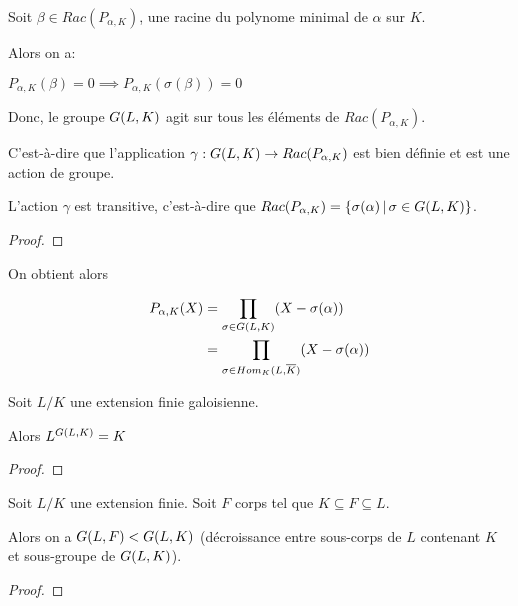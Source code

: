 Soit $\beta \in Rac(P_{\alpha, K})$, une racine du polynome minimal de $\alpha$
sur $K$.

Alors on a:

$P_{\alpha, K}(\beta) = 0 \implies P_{\alpha, K}(\sigma(\beta)) = 0$

Donc, le groupe $G(L, K)$ agit sur tous les éléments de
$Rac(P_{\alpha, K})$.

C'est-à-dire que l'application
$\gamma : G(L, K) \rightarrow Rac(P_{\alpha, K})$ est bien définie
et est une action de groupe.

\begin{proposition}
	L'action $\gamma$ est transitive, c'est-à-dire que $Rac(P_{\alpha, K}) =
	\left\{\sigma(\alpha) \, | \, \sigma \in G(L, K) \right\}$.
\end{proposition}

\ifdefined\outputproof
\begin{proof}

\end{proof}
\fi

On obtient alors

\begin{align*}
	P_{\alpha, K}(X) &= \displaystyle \prod_{\sigma \in
	G(L, K)} (X - \sigma(\alpha)) \\
	&= \displaystyle \prod_{\sigma \in Hom_{K}(L, \overline{K})} (X - \sigma(\alpha))
\end{align*}

\begin{theorem}
	Soit $L/K$ une extension finie galoisienne.

	Alors $L^{G(L, K)} = K$
\end{theorem}

\ifdefined\outputproof
\begin{proof}

\end{proof}
\fi

\begin{proposition}
	\label{prop:correspondance_subfield_to_subgroup}
	Soit $L/K$ une extension finie.
	Soit $F$ corps tel que $K \subseteq F \subseteq L$.

	Alors on a $G(L, F) < G(L, K)$ (décroissance entre
	sous-corps de $L$ contenant $K$ et sous-groupe de $G(L, K)$).
\end{proposition}

\ifdefined\outputproof
\begin{proof}

\end{proof}
\fi

